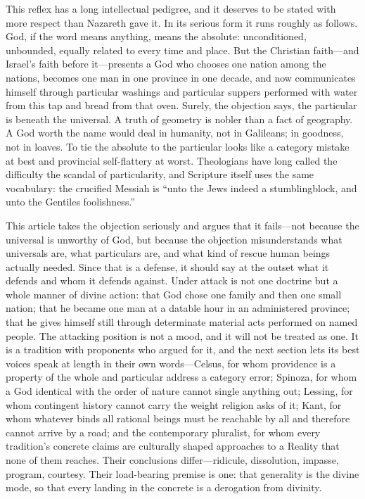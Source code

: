 This reflex has a long intellectual pedigree, and it deserves to be stated with more respect than Nazareth gave it. In its serious form it runs roughly as follows. God, if the word means anything, means the absolute: unconditioned, unbounded, equally related to every time and place. But the Christian faith---and Israel's faith before it---presents a God who chooses one nation among the nations, becomes one man in one province in one decade, and now communicates himself through particular washings and particular suppers performed with water from this tap and bread from that oven. Surely, the objection says, the particular is beneath the universal. A truth of geometry is nobler than a fact of geography. A God worth the name would deal in humanity, not in Galileans; in goodness, not in loaves. To tie the absolute to the particular looks like a category mistake at best and provincial self-flattery at worst. Theologians have long called the difficulty the scandal of particularity, and Scripture itself uses the same vocabulary: the crucified Messiah is ``unto the Jews indeed a stumblingblock, and unto the Gentiles foolishness.''\,

This article takes the objection seriously and argues that it fails---not because the universal is unworthy of God, but because the objection misunderstands what universals are, what particulars are, and what kind of rescue human beings actually needed. Since that is a defense, it should say at the outset what it defends and whom it defends against. Under attack is not one doctrine but a whole manner of divine action: that God chose one family and then one small nation; that he became one man at a datable hour in an administered province; that he gives himself still through determinate material acts performed on named people. The attacking position is not a mood, and it will not be treated as one. It is a tradition with proponents who argued for it, and the next section lets its best voices speak at length in their own words---Celsus, for whom providence is a property of the whole and particular address a category error; Spinoza, for whom a God identical with the order of nature cannot single anything out; Lessing, for whom contingent history cannot carry the weight religion asks of it; Kant, for whom whatever binds all rational beings must be reachable by all and therefore cannot arrive by a road; and the contemporary pluralist, for whom every tradition's concrete claims are culturally shaped approaches to a Reality that none of them reaches. Their conclusions differ---ridicule, dissolution, impasse, program, courtesy. Their load-bearing premise is one: that generality is the divine mode, so that every landing in the concrete is a derogation from divinity.

